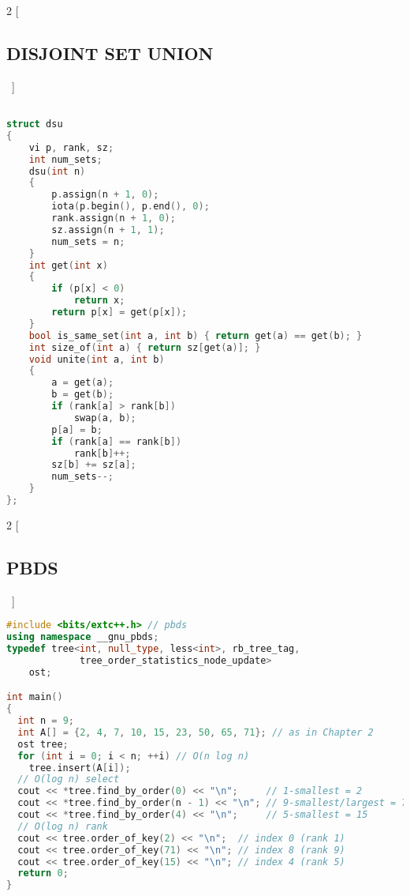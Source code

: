 \documentclass[leter]{amsart}
\begin{document}
\begin{multicols}{2}
[\subsection{DISJOINT SET UNION}\ ]
\begin{lstlisting}[language=C++]

struct dsu
{
    vi p, rank, sz;
    int num_sets;
    dsu(int n)
    {
        p.assign(n + 1, 0);
        iota(p.begin(), p.end(), 0);
        rank.assign(n + 1, 0);
        sz.assign(n + 1, 1);
        num_sets = n;
    }
    int get(int x)
    {
        if (p[x] < 0)
            return x;
        return p[x] = get(p[x]);
    }
    bool is_same_set(int a, int b) { return get(a) == get(b); }
    int size_of(int a) { return sz[get(a)]; }
    void unite(int a, int b)
    {
        a = get(a);
        b = get(b);
        if (rank[a] > rank[b])
            swap(a, b);
        p[a] = b;
        if (rank[a] == rank[b])
            rank[b]++;
        sz[b] += sz[a];
        num_sets--;
    }
};


\end{lstlisting}
\end{multicols}
\begin{multicols}{2}
[\subsection{PBDS}\ ]
\begin{lstlisting}[language=C++]
#include <bits/extc++.h> // pbds
using namespace __gnu_pbds;
typedef tree<int, null_type, less<int>, rb_tree_tag,
             tree_order_statistics_node_update>
    ost;

int main()
{
  int n = 9;
  int A[] = {2, 4, 7, 10, 15, 23, 50, 65, 71}; // as in Chapter 2
  ost tree;
  for (int i = 0; i < n; ++i) // O(n log n)
    tree.insert(A[i]);
  // O(log n) select
  cout << *tree.find_by_order(0) << "\n";     // 1-smallest = 2
  cout << *tree.find_by_order(n - 1) << "\n"; // 9-smallest/largest = 71
  cout << *tree.find_by_order(4) << "\n";     // 5-smallest = 15
  // O(log n) rank
  cout << tree.order_of_key(2) << "\n";  // index 0 (rank 1)
  cout << tree.order_of_key(71) << "\n"; // index 8 (rank 9)
  cout << tree.order_of_key(15) << "\n"; // index 4 (rank 5)
  return 0;
}


\end{lstlisting}
\end{multicols}
\end{document}
